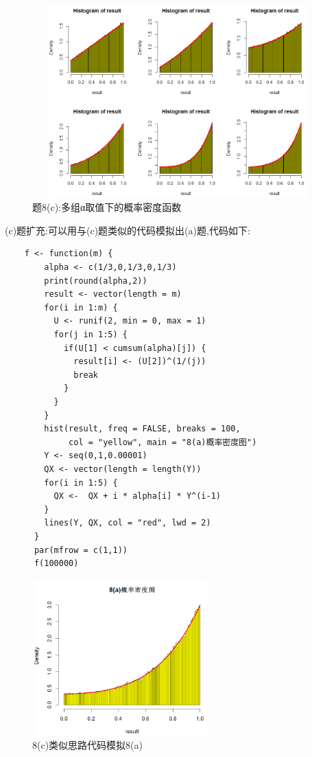 \documentclass{book}
\begin{document}
\begin{figure}[H]
  \centering
  \includegraphics*[height = 7.4cm, width = 11.5cm]{gramFile/第八题/(c)题多组α取值下的概率密度函数.PNG}
  \caption{题8(c):多组α取值下的概率密度函数}
\end{figure}

\noindent
(c)题扩充:可以用与(c)题类似的代码模拟出(a)题,代码如下:
\lstset{language = R}
\begin{lstlisting}
    f <- function(m) {
        alpha <- c(1/3,0,1/3,0,1/3)
        print(round(alpha,2))
        result <- vector(length = m)
        for(i in 1:m) {
          U <- runif(2, min = 0, max = 1)
          for(j in 1:5) {
            if(U[1] < cumsum(alpha)[j]) {
              result[i] <- (U[2])^(1/(j))
              break
            } 
          }
        }
        hist(result, freq = FALSE, breaks = 100, 
             col = "yellow", main = "8(a)概率密度图")
        Y <- seq(0,1,0.00001)
        QX <- vector(length = length(Y))
        for(i in 1:5) {
          QX <-  QX + i * alpha[i] * Y^(i-1)
        }
        lines(Y, QX, col = "red", lwd = 2)
      }
      par(mfrow = c(1,1))
      f(100000)
\end{lstlisting}
\begin{figure}[H]
  \centering
  \includegraphics*[height = 6cm, width = 6.8cm]{gramFile/第八题/8(c)类似思路代码模拟8(a).PNG}
  \caption{8(c)类似思路代码模拟8(a)}
\end{figure}
\end{document}
